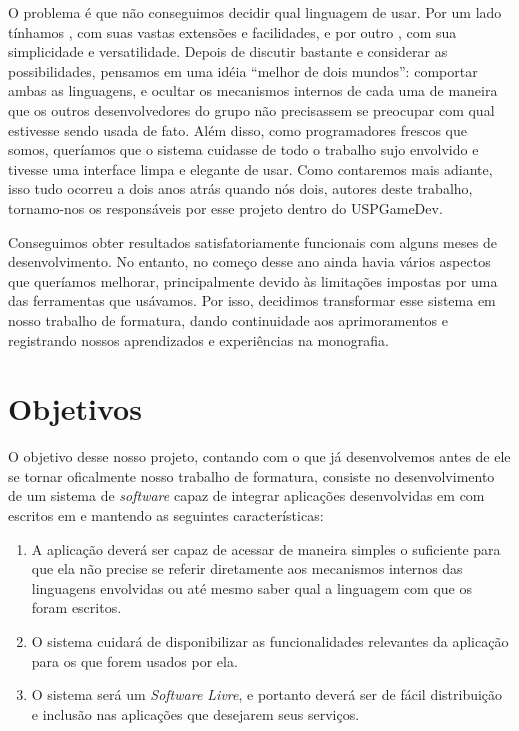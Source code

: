 O problema é que não conseguimos decidir qual linguagem de \script{} usar.
Por um lado tínhamos , com suas vastas extensões e facilidades, e
por outro , com sua simplicidade e versatilidade. Depois de discutir
bastante e considerar as possibilidades, pensamos em uma idéia ``melhor de dois
mundos'': comportar ambas as linguagens, e ocultar os mecanismos internos de
cada uma de maneira que os outros desenvolvedores do grupo não precisassem se
preocupar com qual estivesse sendo usada de fato. Além disso, como programadores
frescos que somos, queríamos que o sistema cuidasse de todo o trabalho sujo
envolvido e tivesse uma interface limpa e elegante de usar. Como contaremos mais
adiante, isso tudo ocorreu a dois anos atrás quando nós dois, autores deste
trabalho, tornamo-nos os responsáveis por esse projeto dentro do USPGameDev.

Conseguimos obter resultados satisfatoriamente funcionais com alguns meses de
desenvolvimento. No entanto, no começo desse ano ainda havia vários aspectos que
queríamos melhorar, principalmente devido às limitações impostas por uma das
ferramentas que usávamos. Por isso, decidimos transformar esse sistema em nosso
trabalho de formatura, dando continuidade aos aprimoramentos e registrando
nossos aprendizados e experiências na monografia.

\section{Objetivos}
\label{cap:intr:objetivos}

  O objetivo desse nosso projeto, contando com o que já desenvolvemos antes de
  ele se tornar oficalmente nosso trabalho de formatura, consiste no
  desenvolvimento de um sistema de \textit{software} capaz de integrar
  aplicações desenvolvidas em \CXX{} com  escritos em  e
   mantendo as seguintes características:
  
  \begin{enumerate}

    \item A aplicação deverá ser capaz de acessar  de maneira simples
          o suficiente para que ela não precise se referir diretamente aos
          mecanismos internos das linguagens envolvidas ou até mesmo saber qual a
          linguagem com que os  foram escritos.
    \item O sistema cuidará de disponibilizar as funcionalidades relevantes da
          aplicação para os  que forem usados por ela.
    \item O sistema será um \textit{Software Livre}, e portanto deverá ser de
          fácil distribuição e inclusão nas aplicações que desejarem seus
          serviços.

  \end{enumerate}

